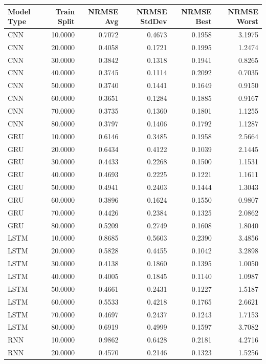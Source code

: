 \begin{tabular}{lrrrrr}
\toprule
Model Type & Train Split & NRMSE Avg & NRMSE StdDev & NRMSE Best & NRMSE Worst \\
\midrule
CNN & 10.0000 & 0.7072 & 0.4673 & 0.1958 & 3.1975 \\
CNN & 20.0000 & 0.4058 & 0.1721 & 0.1995 & 1.2474 \\
CNN & 30.0000 & 0.3842 & 0.1318 & 0.1941 & 0.8265 \\
CNN & 40.0000 & 0.3745 & 0.1114 & 0.2092 & 0.7035 \\
CNN & 50.0000 & 0.3740 & 0.1441 & 0.1649 & 0.9150 \\
CNN & 60.0000 & 0.3651 & 0.1284 & 0.1885 & 0.9167 \\
CNN & 70.0000 & 0.3735 & 0.1360 & 0.1801 & 1.1255 \\
CNN & 80.0000 & 0.3797 & 0.1406 & 0.1792 & 1.1287 \\
GRU & 10.0000 & 0.6146 & 0.3485 & 0.1958 & 2.5664 \\
GRU & 20.0000 & 0.6434 & 0.4122 & 0.1039 & 2.1445 \\
GRU & 30.0000 & 0.4433 & 0.2268 & 0.1500 & 1.1531 \\
GRU & 40.0000 & 0.4693 & 0.2225 & 0.1221 & 1.1611 \\
GRU & 50.0000 & 0.4941 & 0.2403 & 0.1444 & 1.3043 \\
GRU & 60.0000 & 0.3896 & 0.1624 & 0.1550 & 0.9807 \\
GRU & 70.0000 & 0.4426 & 0.2384 & 0.1325 & 2.0862 \\
GRU & 80.0000 & 0.5209 & 0.2749 & 0.1608 & 1.8040 \\
LSTM & 10.0000 & 0.8685 & 0.5603 & 0.2390 & 3.4856 \\
LSTM & 20.0000 & 0.5828 & 0.4455 & 0.1042 & 3.2898 \\
LSTM & 30.0000 & 0.4138 & 0.1860 & 0.1395 & 1.0050 \\
LSTM & 40.0000 & 0.4005 & 0.1845 & 0.1140 & 1.0987 \\
LSTM & 50.0000 & 0.4661 & 0.2431 & 0.1227 & 1.5187 \\
LSTM & 60.0000 & 0.5533 & 0.4218 & 0.1765 & 2.6621 \\
LSTM & 70.0000 & 0.4697 & 0.2437 & 0.1243 & 1.7153 \\
LSTM & 80.0000 & 0.6919 & 0.4999 & 0.1597 & 3.7082 \\
RNN & 10.0000 & 0.9862 & 0.6428 & 0.2181 & 4.2716 \\
RNN & 20.0000 & 0.4570 & 0.2146 & 0.1323 & 1.5256 \\

\end{tabular}
